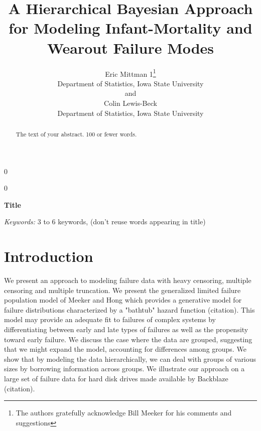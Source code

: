 \documentclass[12pt]{article}
\newcommand{\blind}{0}
\begin{document}
%

\def\spacingset#1{\renewcommand{\baselinestretch}%
{#1}\small\normalsize} \spacingset{1}



\blind
{
  \title{\bf A Hierarchical Bayesian Approach for Modeling Infant-Mortality and Wearout Failure Modes}
  \author{Eric Mittman 1\thanks{
    The authors gratefully acknowledge Bill Meeker for his comments and suggestions}\hspace{.2cm}\\
    Department of Statistics, Iowa State University\\
    and \\
    Colin Lewis-Beck \\
    Department of Statistics, Iowa State University}
  \maketitle
} \fi

\blind
{
  \bigskip
  \bigskip
  \bigskip
  \begin{center}
    {\LARGE\bf Title}
\end{center}
  \medskip
} \fi

\bigskip
\begin{abstract}
The text of your abstract.  100 or fewer words.
\end{abstract}

\noindent%
{\it Keywords:}  3 to 6 keywords, (don't reuse words appearing in title)
\vfill

\newpage
\spacingset{1.45} %
\section{Introduction}
We present an approach to modeling failure data with heavy censoring, multiple censoring and multiple truncation. We present the generalized limited failure population model of Meeker and Hong which provides a generative model for failure distributions characterized by a "bathtub" hazard function (citation). This model may provide an adequate fit to failures of complex systems by differentiating between early and late types of failures as well as the propensity toward early failure. We discuss the case where the data are grouped, suggesting that we might expand the model, accounting for differences among groups. We show that by modeling the data hierarchically, we can deal with groups of various sizes by borrowing information across groups. We illustrate our approach on a large set of failure data for hard disk drives made available by Backblaze (citation). 
\end{document}
